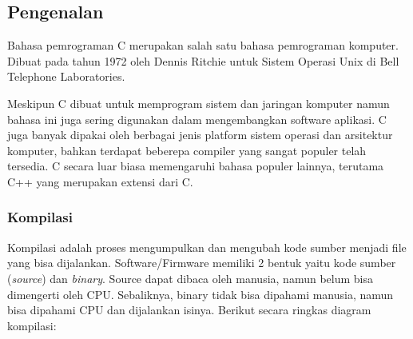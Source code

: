 \documentclass[12pt,]{article}
\begin{document}
	\newpage	
	\subsection{Pengenalan}
	Bahasa pemrograman C merupakan salah satu bahasa pemrograman komputer. Dibuat pada tahun 1972 oleh Dennis Ritchie untuk Sistem Operasi Unix di Bell Telephone Laboratories.
	
	Meskipun C dibuat untuk memprogram sistem dan jaringan komputer namun bahasa ini juga sering digunakan dalam mengembangkan software aplikasi.
	C juga banyak dipakai oleh berbagai jenis platform sistem operasi dan arsitektur komputer, bahkan terdapat beberepa compiler yang sangat populer telah tersedia.
	C secara luar biasa memengaruhi bahasa populer lainnya, terutama C++ yang merupakan extensi dari C.
	
	\subsubsection{Kompilasi}
	Kompilasi adalah proses mengumpulkan dan mengubah kode sumber menjadi file yang bisa dijalankan.
	Software/Firmware memiliki 2 bentuk yaitu kode sumber (\textit{source}) dan \textit{binary}.
	Source dapat dibaca oleh manusia, namun belum bisa dimengerti oleh CPU.
	Sebaliknya, binary tidak bisa dipahami manusia, namun bisa dipahami CPU dan dijalankan isinya. 
	Berikut secara ringkas diagram kompilasi:
	
\end{document}
